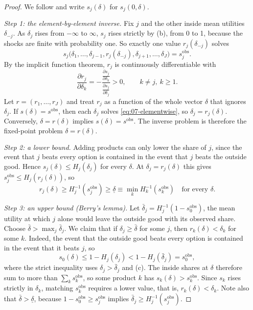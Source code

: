 \begin{proof}
We follow \citet[pp.~260--261]{Berry1994} and write $s_j(\delta)$ for $s_j(0, \delta)$.

\emph{Step 1: the element-by-element inverse.} Fix $j$ and the other inside mean utilities $\delta_{-j}$. As
$\delta_j$ rises from $-\infty$ to $\infty$, $s_j$ rises strictly by (b), from 0 to 1, because the shocks are
finite with probability one. So exactly one value $r_j(\delta_{-j})$ solves
\begin{equation}\label{eq:07-elementwise}
  s_j\big(\delta_1, \dots, \delta_{j-1}, r_j(\delta_{-j}), \delta_{j+1}, \dots, \delta_J\big) = s^{\mathrm{obs}}_j .
\end{equation}
By the implicit function theorem, $r_j$ is continuously differentiable with
\begin{equation}\label{eq:07-r-derivative}
  \frac{\partial r_j}{\partial \delta_k} = -\frac{\frac{\partial s_j}{\partial \delta_k}}{\frac{\partial s_j}
  {\partial \delta_j}} > 0, \qquad k \ne j,\ k \ge 1 .
\end{equation}
Let $r = (r_1, \dots, r_J)$ and treat $r_j$ as a function of the whole vector $\delta$ that ignores
$\delta_j$. If $s(\delta) = s^{\mathrm{obs}}$, then each $\delta_j$ solves \eqref{eq:07-elementwise}, so
$\delta_j = r_j(\delta)$. Conversely, $\delta = r(\delta)$ implies $s(\delta) = s^{\mathrm{obs}}$. The
inverse problem is therefore the fixed-point problem $\delta = r(\delta)$.

\emph{Step 2: a lower bound.} Adding products can only lower the share of $j$, since the event that $j$ beats
every option is contained in the event that $j$ beats the outside good. Hence $s_j(\delta) \le
H_j(\delta_j)$ for every $\delta$. At $\delta_j = r_j(\delta)$ this gives $s^{\mathrm{obs}}_j \le
H_j(r_j(\delta))$, so
\begin{equation*}
  r_j(\delta) \ge H_j^{-1}(s^{\mathrm{obs}}_j) \ge \underline\delta \equiv \min_k H_k^{-1}(s^{\mathrm{obs}}_k)
  \quad \text{for every } \delta .
\end{equation*}

\emph{Step 3: an upper bound (Berry's lemma).} Let $\bar\delta_j = H_j^{-1}(1 - s^{\mathrm{obs}}_0)$, the mean
utility at which $j$ alone would leave the outside good with its observed share. Choose $\bar\delta >
\max_j \bar\delta_j$. We claim that if $\delta_j \ge \bar\delta$ for some $j$, then $r_k(\delta) < \delta_k$
for some $k$. Indeed, the event that the outside good beats every option is contained in the event that it
beats $j$, so
\begin{equation*}
  s_0(\delta) \le 1 - H_j(\delta_j) < 1 - H_j(\bar\delta_j) = s^{\mathrm{obs}}_0 ,
\end{equation*}
where the strict inequality uses $\delta_j > \bar\delta_j$ and (c). The inside shares at $\delta$ therefore sum to
more than $\sum_k s^{\mathrm{obs}}_k$, so some product $k$ has $s_k(\delta) > s^{\mathrm{obs}}_k$. Since $s_k$
rises strictly in $\delta_k$, matching $s^{\mathrm{obs}}_k$ requires a lower value, that is, $r_k(\delta) <
\delta_k$. Note also that $\bar\delta > \underline\delta$, because $1 - s^{\mathrm{obs}}_0 \ge
s^{\mathrm{obs}}_j$ implies $\bar\delta_j \ge H_j^{-1}(s^{\mathrm{obs}}_j)$.


\end{proof}
